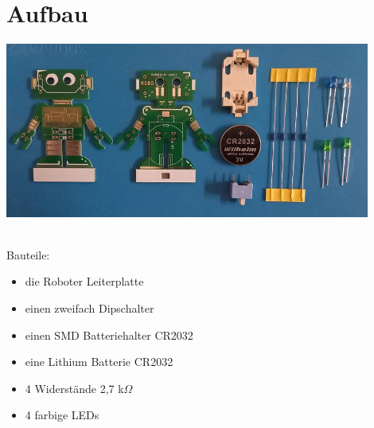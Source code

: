 \documentclass[a4paper]{article}
\begin{document}
\section{Aufbau}
\begin{minipage}[t]{\textwidth}
  \centering
  \includegraphics[width=0.9\textwidth]{../pictures/Parts.jpg}
  \label{img:Bauteile}
\end{minipage}
\ \\
Bauteile:
\begin{itemize}
\item die Roboter Leiterplatte
\item einen zweifach Dipschalter
\item einen SMD Batteriehalter CR2032
\item eine Lithium Batterie CR2032
\item 4 Widerstände 2,7 k$\Omega$ 
\item 4 farbige LEDs
\end{itemize}
\end{document}
